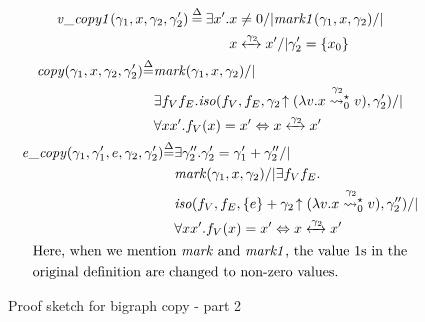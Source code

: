 \documentclass[acmsmall,review,anonymous]{acmart}\settopmatter{printfolios=true,printccs=false,printacmref=false}
\newcommand{\defeq}{\mathbin{\stackrel{\Delta}{=}}}
\begin{document}
\begin{figure}
\begin{gather*}
\begin{split}
  \m{v\_copy1}(\gamma_1, x, \gamma_2, \gamma_2')\defeq  \exists x'. & x \neq 0 /| \m{mark1}(\gamma_1,x, \gamma_2) /| \\
    & x \xleftrightarrow{\gamma_2} x' /| \gamma_2' = \{x_0\}
  \end{split}\\
  \begin{split}
  \m{copy}(\gamma_1, x, \gamma_2, \gamma_2')\defeq &\m{mark}(\gamma_1,x, \gamma_2) /| \\
   & \exists f_V f_E. \m{iso}(f_V, f_E,  \gamma_2\!\uparrow(\lambda v. x\mathrel{{\stackrel{\gamma_2~}{\leadsto^{\star}_{0}}}} v), \gamma_2') /| \\
   & \forall x x'. f_V(x) = x' \Leftrightarrow x \xleftrightarrow{\gamma_2} x'
  \end{split}\\
  \begin{split}
  \m{e\_copy}(\gamma_1, \gamma_1', e, \gamma_2, \gamma_2')\defeq & \exists \gamma_2''. \gamma_2' = \gamma_1' + \gamma_2'' /| \\
  & \m{mark}(\gamma_1,x, \gamma_2) /| \exists f_V f_E.  \\
   & \m{iso}(f_V, f_E,  \{e\} +\gamma_2\!\uparrow(\lambda v. x\mathrel{{\stackrel{\gamma_2~}{\leadsto^{\star}_{0}}}} v), \gamma_2'') /| \\
   & \forall x x'. f_V(x) = x' \Leftrightarrow x \xleftrightarrow{\gamma_2} x'
  \end{split}\\
  \begin{split}
&\text{Here, when we mention \m{mark} and \m{mark1}, the value 1s in the} \\
&\text{original definition are changed to non-zero values.}
  \end{split}\\
\end{gather*}
\caption{Proof sketch for bigraph copy - part 2}
\label{fig:copy-part2}
\end{figure}
 
\end{document}
